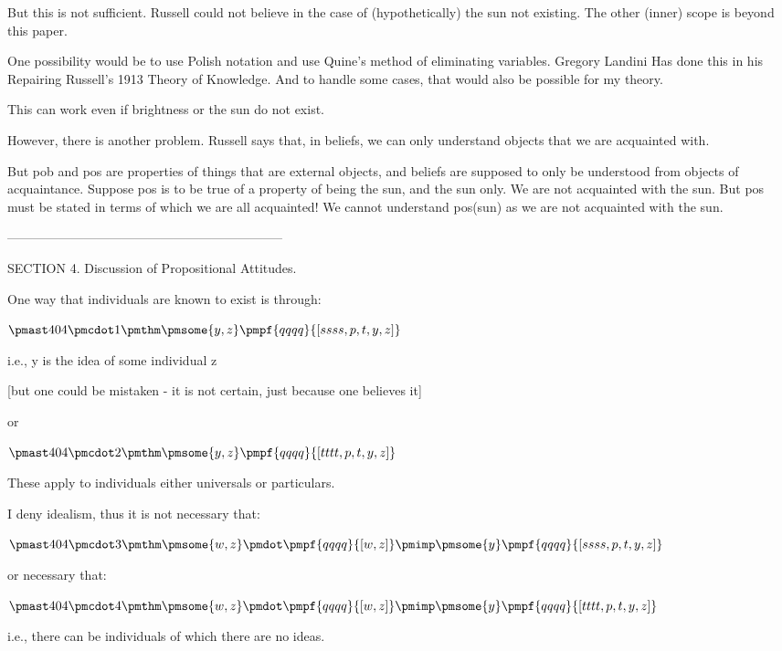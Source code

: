 \documentclass[12pt]{article}
\begin{document}
But this is not sufficient. Russell could not believe in the case of (hypothetically) the sun not existing. The other (inner) scope is beyond this paper.

One possibility would be to use Polish notation and use Quine's method of eliminating variables. Gregory Landini Has done this in his Repairing Russell's 1913 Theory of Knowledge. And to handle some cases, that would also be possible for my theory. 

This can work even if brightness or the sun do not exist.

However, there is another problem. Russell says that, in beliefs, we can only understand objects that we are acquainted with. 

But pob and pos are properties of things that are external objects, and beliefs are supposed to only be understood from objects of acquaintance. Suppose pos is to be true of a property of being the sun, and the sun only. We are not acquainted with the sun. But pos must be stated in terms of which we are all acquainted! We cannot understand pos(sun) as we are not acquainted with the sun.

-----------------------------------------------------------------

SECTION 4. Discussion of Propositional Attitudes.

One way that individuals are known to exist is through:

$\pmast 404 \pmcdot 1 \pmthm \pmsome{y,z} \pmpf{qqqq}{[ssss,p,t,y,z]}$

i.e., y is the idea of some individual z

[but one could be mistaken - it is not certain, just because one believes it]

or

$\pmast 404 \pmcdot 2 \pmthm \pmsome{y,z} \pmpf{qqqq}{[tttt,p,t,y,z]}$

These apply to individuals either universals or particulars.

I deny idealism, thus it is not necessary that:

$\pmast 404 \pmcdot 3 \pmthm \pmsome{w,z} \pmdot \pmpf{qqqq}{[w, z]} \pmimp \pmsome{y} \pmpf{qqqq}{[ssss,p,t,y,z]}$

or necessary that:

$\pmast 404 \pmcdot 4 \pmthm \pmsome{w,z} \pmdot \pmpf{qqqq}{[w, z]} \pmimp \pmsome{y} \pmpf{qqqq}{[tttt,p,t,y,z]}$

i.e., there can be individuals of which there are no ideas.
\end{document}
